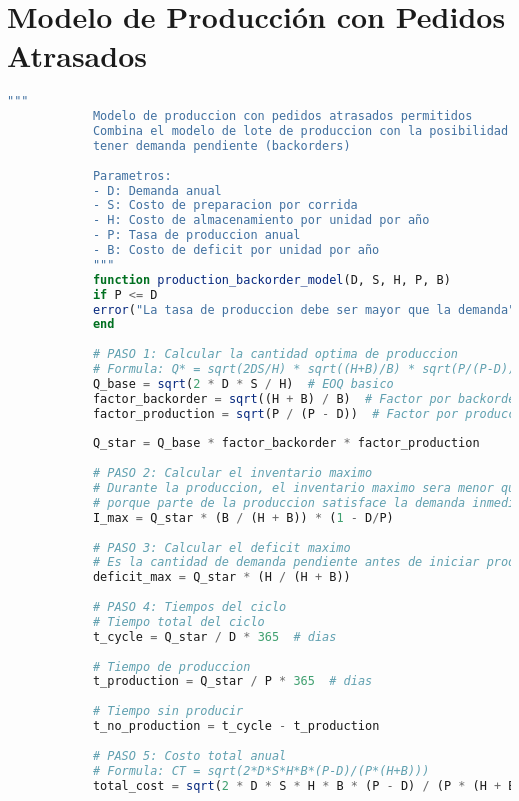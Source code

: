\documentclass[12pt,a4paper]{book}
\begin{document}
	\section{Modelo de Producci\'on con Pedidos Atrasados}
	
	\begin{tcolorbox}[enhanced,colback=violetaclaro,colframe=moradoacento,boxrule=3pt,arc=12pt,
		drop shadow,title={\Large\bfseries\color{white} \faIndustry\ PRODUCCI\'ON CON BACKORDERS},breakable]
		
		\begin{lstlisting}[language=Julia,basicstyle=\footnotesize\ttfamily]
			"""
			Modelo de produccion con pedidos atrasados permitidos
			Combina el modelo de lote de produccion con la posibilidad de 
			tener demanda pendiente (backorders)
			
			Parametros:
			- D: Demanda anual
			- S: Costo de preparacion por corrida
			- H: Costo de almacenamiento por unidad por año
			- P: Tasa de produccion anual
			- B: Costo de deficit por unidad por año
			"""
			function production_backorder_model(D, S, H, P, B)
			if P <= D
			error("La tasa de produccion debe ser mayor que la demanda")
			end
			
			# PASO 1: Calcular la cantidad optima de produccion
			# Formula: Q* = sqrt(2DS/H) * sqrt((H+B)/B) * sqrt(P/(P-D))
			Q_base = sqrt(2 * D * S / H)  # EOQ basico
			factor_backorder = sqrt((H + B) / B)  # Factor por backorders
			factor_production = sqrt(P / (P - D))  # Factor por produccion
			
			Q_star = Q_base * factor_backorder * factor_production
			
			# PASO 2: Calcular el inventario maximo
			# Durante la produccion, el inventario maximo sera menor que Q*
			# porque parte de la produccion satisface la demanda inmediata
			I_max = Q_star * (B / (H + B)) * (1 - D/P)
			
			# PASO 3: Calcular el deficit maximo
			# Es la cantidad de demanda pendiente antes de iniciar produccion
			deficit_max = Q_star * (H / (H + B))
			
			# PASO 4: Tiempos del ciclo
			# Tiempo total del ciclo
			t_cycle = Q_star / D * 365  # dias
			
			# Tiempo de produccion
			t_production = Q_star / P * 365  # dias
			
			# Tiempo sin producir
			t_no_production = t_cycle - t_production
			
			# PASO 5: Costo total anual
			# Formula: CT = sqrt(2*D*S*H*B*(P-D)/(P*(H+B)))
			total_cost = sqrt(2 * D * S * H * B * (P - D) / (P * (H + B)))
			

\end{lstlisting}
\end{tcolorbox}
\end{document}
